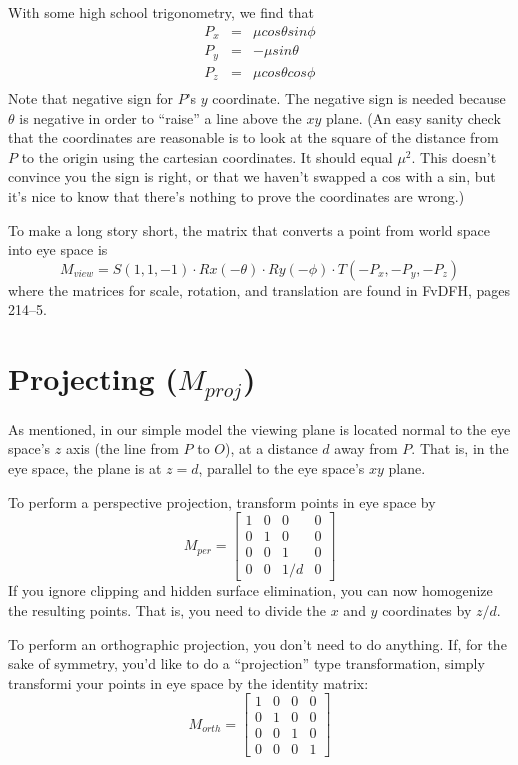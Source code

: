 With some high school trigonometry, we find that 
\begin{eqnarray*}
    P_x &=&   \mu cos \theta sin \phi   \\    
    P_y &=& - \mu sin \theta            \\
    P_z &=&   \mu cos \theta cos \phi   \\
\end{eqnarray*}
Note that negative sign for $P$'s $y$ coordinate. The negative sign is
needed because 
$\theta$ is negative in order to ``raise'' a line above the 
$xy$ plane. (An easy sanity check that the
coordinates are reasonable is to look at the square of the distance 
from $P$ to the origin using the cartesian coordinates. It should
equal $\mu^2$.
This doesn't convince you the sign is right, or that we haven't swapped
a cos with a sin, but it's nice to know
that there's nothing to prove the coordinates are wrong.) 

To make a long story short, the matrix that converts a point from world space
into eye space is  
\[
    M_{view} = 
      S(1, 1, -1) \cdot Rx(-\theta) \cdot Ry(-\phi) \cdot T(-P_x, -P_y, -P_z) 
\]
where the matrices for scale, rotation, and translation are found 
in FvDFH, pages 214--5.


\section{ Projecting ($M_{proj}$) }

As mentioned, in our simple model the viewing plane is located normal to the
eye space's $z$ axis (the line from $P$ to $O$), at a distance $d$ away from
$P$. That is, in the eye space, the plane is at $z=d$, parallel to the eye
space's $xy$ plane.

To perform a perspective projection, transform points in eye space
by
\[
    M_{per} =  
       \left[
       \begin{array}{cccc}
       1 & 0 & 0 & 0 \\
       0 & 1 & 0 & 0 \\
       0 & 0 & 1 & 0 \\
       0 & 0 & 1/d & 0
       \end{array}
       \right]
\]
If you ignore clipping and hidden surface elimination, you can now 
homogenize the resulting points. That is, you need to divide the 
$x$ and $y$ coordinates by $z/d$.

To perform an orthographic projection, you don't need to do anything.
If, for the sake of symmetry, you'd like to do a ``projection'' type
transformation, simply transformi your points in eye space
by the identity matrix:
\[
    M_{orth} =  
       \left[
       \begin{array}{cccc}
       1 & 0 & 0 & 0 \\
       0 & 1 & 0 & 0 \\
       0 & 0 & 1 & 0 \\
       0 & 0 & 0 & 1
       \end{array}
       \right]
\]

